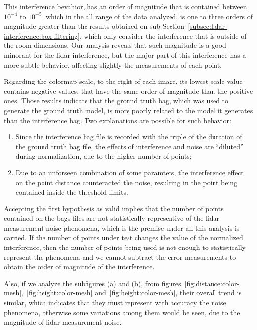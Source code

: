 This interference bevahior, has an order of magnitude that is contained between $10^{-4}$ to $10^{-5}$, which in the all range of the data analyzed, is one to three orders of magnitude greater than the results obtained on sub-Section~\ref{subsec:lidar-interference:box-filtering}, which only consider the interference that is outside of the room dimensions. Our analysis reveals that such magnitude is a good minorant for the \ac{lidar} interference, but the major part of this interference has a more subtle behavior, affecting slightly the measurements of each point.

Regarding the colormap scale, to the right of each image, its lowest scale value contains negative values, that have the same order of magnitude than the positive ones. Those results indicate that the ground truth bag, which was used to generate the ground truth model, is more poorly related to the model it generates than the interference bag. Two explanations are possible for such behavior:

\begin{enumerate}
	\item Since the interference bag file is recorded with the triple of the duration of the ground truth bag file, the effects of interference and noise are ``diluted'' during normalization, due to the higher number of points;
	\item Due to an unforseen  combination of some paramters, the interference effect on the point distance counteracted the noise, resulting in the point being contained inside the threshold limits.
\end{enumerate}

Accepting the first hypothesis as valid implies that the number of points contained on the bags files are not statistically representive of the \ac{lidar} measurement noise phenomena, which is the premise under all this analysis is carried. If the number of points under test changes the value of the normalized interference, then the number of points being used is not enough to statistically represent the phenomena and we cannot subtract the error measurements to obtain the order of magnitude of the interference.

Also, if we analyze the subfigures (a) and (b), from figures~\ref{fig:distance:color-mesh},~\ref{fig:height:color-mesh} and~\ref{fig:height:color-mesh}, their overall trend is similar, which indicates that they must represent with accuracy the noise phenomena, otherwise some variations among them would be seen, due to the magnitude of \ac{lidar} measurement noise.


